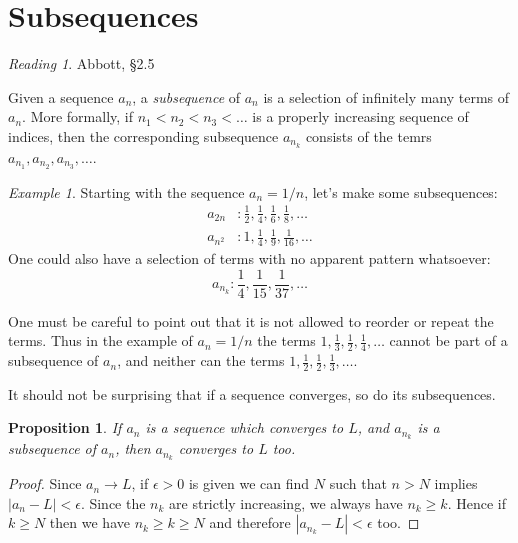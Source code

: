 \documentclass[11pt,oneside]{amsbook}
\theoremstyle{definition}
\theoremstyle{plain}
\newtheorem{proposition}[theorem]{Proposition}
\theoremstyle{definition}
\theoremstyle{remark}
\newtheorem{example}[theorem]{Example}
\newtheorem*{reading}{Reading}
\numberwithin{equation}{section}
\numberwithin{figure}{section}
\begin{document}
\newpage
\section{Subsequences}

\begin{reading}
  Abbott, \S 2.5
\end{reading}

Given a sequence $a_n$, a \emph{subsequence} of $a_n$ is a selection of infinitely many terms of $a_n$. More formally, if $n_1<n_2<n_3<\ldots$ is a properly increasing sequence of indices, then the corresponding subsequence $a_{n_k}$ consists of the temrs $a_{n_1},a_{n_2},a_{n_3},\ldots$.

\begin{example}
  Starting with the sequence $a_n=1/n$, let's make some subsequences:
  \begin{align*}
    a_{2n}&: \frac12, \frac14, \frac16, \frac18, \ldots\\
    a_{n^2}&: 1, \frac14, \frac19, \frac1{16}, \ldots
  \end{align*}
  One could also have a selection of terms with no apparent pattern whatsoever:
  \[a_{n_k}:\frac14, \frac{1}{15}, \frac{1}{37},\ldots
  \]
\end{example}

One must be careful to point out that it is not allowed to reorder or repeat the terms. Thus in the example of $a_n=1/n$ the terms $1,\frac13,\frac12,\frac14,\ldots$ cannot be part of a subsequence of $a_n$, and neither can the terms $1,\frac12,\frac12,\frac13,\ldots$.

It should not be surprising that if a sequence converges, so do its subsequences.

\begin{proposition}
  \label{prop:subsequence}
  If $a_n$ is a sequence which converges to $L$, and $a_{n_k}$ is a subsequence of $a_n$, then $a_{n_k}$ converges to $L$ too.
\end{proposition}

\begin{proof}
  Since $a_n\to L$, if $\epsilon>0$ is given we can find $N$ such that $n>N$ implies $|a_n-L|<\epsilon$. Since the $n_k$ are strictly increasing, we always have $n_k\geq k$. Hence if $k\geq N$ then we have $n_k\geq k\geq N$ and therefore $|a_{n_k}-L|<\epsilon$ too.
\end{proof}
\end{document}

